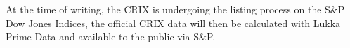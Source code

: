 At the time of writing, the CRIX is undergoing the listing process on
the S\&P Dow Jones Indices, the official CRIX data will then be
calculated with Lukka Prime Data and available to the public via S\&P.



















%
%
%
